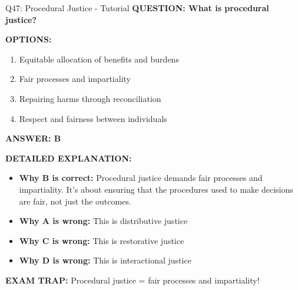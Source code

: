 \documentclass[8pt]{beamer}
\begin{document}
	\begin{frame}{Q47: Procedural Justice - Tutorial}
		\fontsize{6.5}{7.5}\selectfont
		\textbf{QUESTION: What is procedural justice?}
		
		\vspace{0.1cm}
		\textbf{OPTIONS:}
		\begin{enumerate}
			\item Equitable allocation of benefits and burdens
			\item Fair processes and impartiality
			\item Repairing harms through reconciliation
			\item Respect and fairness between individuals
		\end{enumerate}
		
		\vspace{0.1cm}
		\textcolor{myblue}{\textbf{ANSWER: B}}
		
		\vspace{0.1cm}
		\textbf{DETAILED EXPLANATION:}
		\begin{itemize}
			\item \textbf{Why B is correct:} Procedural justice demands fair processes and impartiality. It's about ensuring that the procedures used to make decisions are fair, not just the outcomes.
			\item \textbf{Why A is wrong:} This is distributive justice
			\item \textbf{Why C is wrong:} This is restorative justice
			\item \textbf{Why D is wrong:} This is interactional justice
		\end{itemize}
		
		\textcolor{myred}{\textbf{EXAM TRAP:}} Procedural justice = \textcolor{myblue}{fair processes and impartiality}!
	\end{frame}
	
\end{document}
